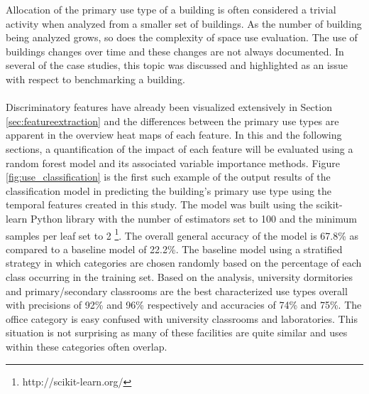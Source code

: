 Allocation of the primary use type of a building is often considered a trivial activity when analyzed from a smaller set of buildings. As the number of building being analyzed grows, so does the complexity of space use evaluation. The use of buildings changes over time and these changes are not always documented. In several of the case studies, this topic was discussed and highlighted as an issue with respect to benchmarking a building.\\
\\
Discriminatory features have already been visualized extensively in Section \ref{sec:featureextraction} and the differences between the primary use types are apparent in the overview heat maps of each feature. In this and the following sections, a quantification of the impact of each feature will be evaluated using a random forest model and its associated variable importance methods. Figure \ref{fig:use_classification} is the first such example of the output results of the classification model in predicting the building's primary use type using the temporal features created in this study. The model was built using the scikit-learn Python library with the number of estimators set to 100 and the minimum samples per leaf set to 2 \footnote{http://scikit-learn.org/}. The overall general accuracy of the model is 67.8\% as compared to a baseline model of 22.2\%. The baseline model using a stratified strategy in which categories are chosen randomly based on the percentage of each class occurring in the training set. Based on the analysis, university dormitories and primary/secondary classrooms are the best characterized use types overall with precisions of 92\% and 96\% respectively and accuracies of 74\% and 75\%. The office category is easy confused with university classrooms and laboratories. This situation is not surprising as many of these facilities are quite similar and uses within these categories often overlap. 